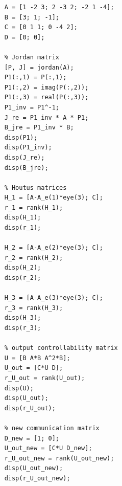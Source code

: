 \documentclass[a4paper, 12pt]{article}
\begin{document}
    
    \begin{lstlisting}[label=task5, caption={Программа для пятого задания}]
    % input data
    A = [1 -2 3; 2 -3 2; -2 1 -4];
    B = [3; 1; -1];
    C = [0 1 1; 0 -4 2];
    D = [0; 0];

    % Jordan matrix
    [P, J] = jordan(A);
    P1(:,1) = P(:,1);
    P1(:,2) = imag(P(:,2));
    P1(:,3) = real(P(:,3));
    P1_inv = P1^-1; 
    J_re = P1_inv * A * P1;
    B_jre = P1_inv * B;
    disp(P1);
    disp(P1_inv);
    disp(J_re);
    disp(B_jre);

    % Houtus matrices
    H_1 = [A-A_e(1)*eye(3); C];
    r_1 = rank(H_1);
    disp(H_1);
    disp(r_1);

    H_2 = [A-A_e(2)*eye(3); C];
    r_2 = rank(H_2);
    disp(H_2);
    disp(r_2);

    H_3 = [A-A_e(3)*eye(3); C];
    r_3 = rank(H_3);
    disp(H_3);
    disp(r_3);

    % output controllability matrix
    U = [B A*B A^2*B];
    U_out = [C*U D];
    r_U_out = rank(U_out);
    disp(U);
    disp(U_out);
    disp(r_U_out);

    % new communication matrix
    D_new = [1; 0];
    U_out_new = [C*U D_new];
    r_U_out_new = rank(U_out_new);
    disp(U_out_new);
    disp(r_U_out_new);
    \end{lstlisting}
\end{document}
